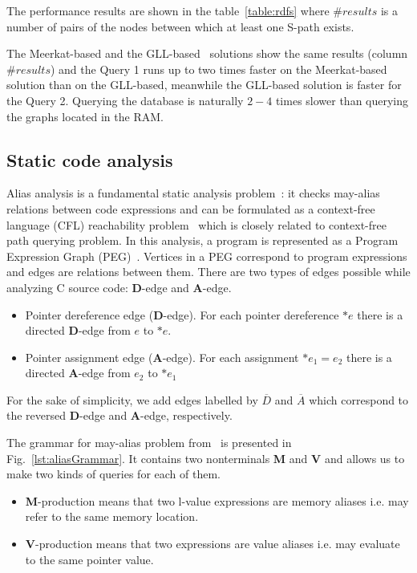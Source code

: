 The performance results are shown in the table~\ref{table:rdfs} where $\#results$ is a number of pairs of the nodes between which at least one S-path exists. 

The Meerkat-based and the GLL-based~\cite{GrigorevR16} solutions show the same results (column $\#results$) and the Query 1 runs up to two times faster on the Meerkat-based solution than on the GLL-based, meanwhile the GLL-based solution is faster for the Query 2. Querying the database is naturally $2-4$ times slower than querying the graphs located in the RAM.


\subsection{Static code analysis}

Alias analysis is a fundamental static analysis problem~\cite{Marlowe}: it checks may-alias relations between code expressions and can be formulated as a context-free language (CFL) reachability problem~\cite{Reps} which is closely related to context-free path querying problem.
In this analysis, a program is represented as a Program Expression Graph (PEG)~\cite{Zheng}.
Vertices in a PEG correspond to program expressions and edges are relations between them.
There are two types of edges possible while analyzing C source code: \textbf{D}-edge and \textbf{A}-edge.

\begin{itemize}
    \item Pointer dereference edge (\textbf{D}-edge). For each pointer dereference $*e$ there is a directed \textbf{D}-edge from $e$ to $*e$.
    \item Pointer assignment edge (\textbf{A}-edge). For each assignment $*e_1=e_2$ there is a directed \textbf{A}-edge from $e_2$ to $*e_1$
\end{itemize}

For the sake of simplicity, we add edges labelled by $\overline{D}$ and $\overline{A}$ which correspond to the reversed \textbf{D}-edge and \textbf{A}-edge, respectively.

The grammar for may-alias problem from~\cite{Zheng} is presented in Fig.~\ref{lst:aliasGrammar}.
It contains two nonterminals \textbf{M} and \textbf{V} and allows us to make two kinds of queries for each of them.

\begin{itemize}
    \item \textbf{M}-production means that two l-value expressions are memory aliases i.e. may refer to the same memory location.
    \item \textbf{V}-production means that two expressions are value aliases i.e. may evaluate to the same pointer value.
\end{itemize}


